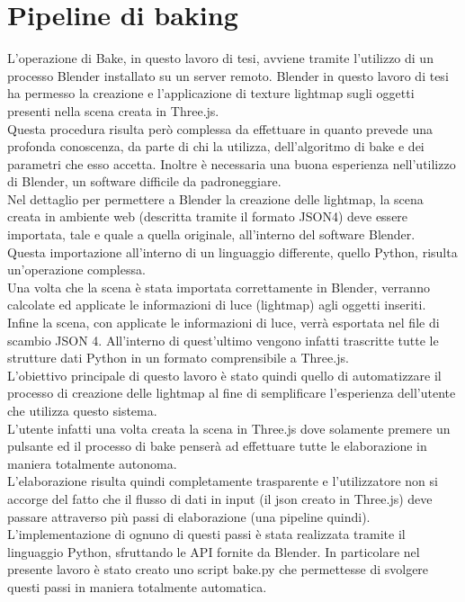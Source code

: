 \section{Pipeline di baking}
\label{sec:chapter_baking_service_pipeline_baking}
L’operazione di Bake, in questo lavoro di tesi, avviene tramite l’utilizzo di un processo Blender installato su un server remoto. Blender in questo lavoro di tesi ha permesso la creazione e l’applicazione di texture lightmap sugli oggetti presenti nella scena creata in Three.js.
\\
Questa procedura risulta però complessa da effettuare in quanto prevede una profonda conoscenza, da parte di chi la utilizza, dell’algoritmo di bake e dei parametri che esso accetta. Inoltre è necessaria una buona esperienza nell’utilizzo di Blender, un software difficile da padroneggiare.
\\
Nel dettaglio per permettere a Blender la creazione delle lightmap, la scena creata in ambiente web (descritta tramite il formato JSON4) deve essere importata, tale e quale a quella originale, all’interno del software Blender. 
\\
Questa importazione all’interno di un linguaggio differente, quello Python, risulta un’operazione complessa.
\\
Una volta che la scena è stata importata correttamente in Blender, verranno calcolate ed applicate le informazioni di luce (lightmap) agli oggetti inseriti. 
Infine la scena, con applicate le informazioni di luce, verrà esportata nel file di scambio JSON 4. All’interno di quest’ultimo vengono infatti trascritte tutte le strutture dati Python in un formato comprensibile a Three.js.
\\
L’obiettivo principale di questo lavoro è stato quindi quello di automatizzare il processo di creazione delle lightmap al fine di semplificare l’esperienza dell’utente che utilizza questo sistema. 
\\
L’utente infatti una volta creata la scena in Three.js dove solamente premere un pulsante ed il processo di bake penserà ad effettuare tutte le elaborazione in maniera totalmente autonoma.
\\
L’elaborazione risulta quindi completamente trasparente e l’utilizzatore non si accorge del fatto che il flusso di dati in input (il json creato in Three.js) deve passare attraverso più passi di elaborazione (una pipeline quindi).
L’implementazione di ognuno di questi passi è stata realizzata tramite il linguaggio Python, sfruttando le API fornite da Blender.
In particolare nel presente lavoro è stato creato uno script bake.py che permettesse di svolgere questi passi in maniera totalmente automatica.

